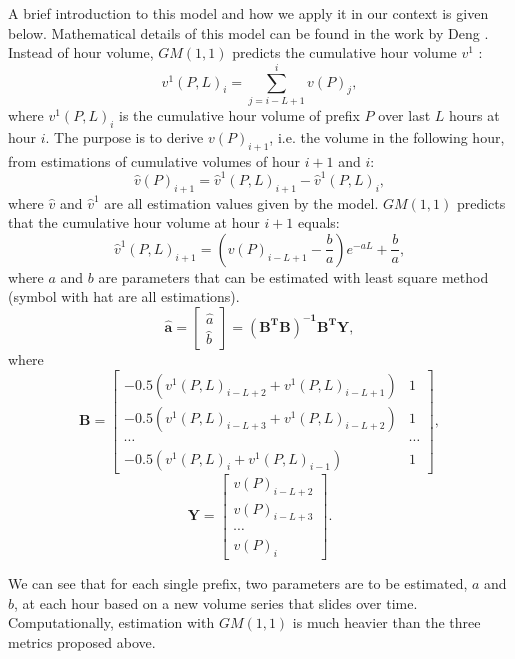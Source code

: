 A brief introduction to this model and how we apply it in our context is given below. Mathematical details of this model can be found in the work by Deng \cite{Julong1989}.
Instead of hour volume, $GM(1,1)$ predicts the cumulative hour volume $v^1$ :
\begin{equation*}
v^1(P,L)_{i} = \displaystyle \sum_{j=i-L+1}^{i} v(P)_j,
\end{equation*}
where $v^1(P,L)_{i}$ is the cumulative hour volume of prefix $P$ over last $L$ hours at hour $i$. The purpose is to derive $v(P)_{i+1}$, i.e. the volume in the following hour, from estimations of cumulative volumes of hour $i+1$ and $i$:
\begin{equation*}
\hat{v}(P)_{i+1} = \hat{v}^1(P,L)_{i+1} - \hat{v}^1(P,L)_{i},
\end{equation*}
where $\hat v$ and $\hat v ^1$ are all estimation values given by the model.
$GM(1,1)$ predicts that the cumulative hour volume at hour $i+1$ equals:
\begin{equation*}
\hat v ^1 (P,L)_{i+1} = (v(P)_{i-L+1} - \frac{b}{a}) e^{-aL} + \frac{b}{a},
\end{equation*}
where $a$ and $b$ are parameters that can be estimated with least square method (symbol with hat are all estimations).
\begin{equation*}
\mathbf{\hat a} = \begin{bmatrix}
\hat a \\ \hat b
\end{bmatrix} = \mathbf{(B^TB)^{-1}B^T Y},
\end{equation*}
where
\begin{equation*}
\mathbf{B} = \begin{bmatrix}
-0.5(v^1(P,L)_{i-L+2} + v^1(P,L)_{i-L+1}) & 1\\
-0.5(v^1(P,L)_{i-L+3} + v^1(P,L)_{i-L+2}) & 1\\
\cdots & \cdots \\
-0.5(v^1(P,L)_i + v^1(P,L)_{i-1}) & 1
\end{bmatrix},
\end{equation*}
\begin{equation*}
\mathbf{Y} = \begin{bmatrix}
v(P)_{i-L+2}\\
v(P)_{i-L+3}\\
\cdots\\
v(P)_i
\end{bmatrix}.
\end{equation*}

We can see that for each single prefix, two parameters are to be estimated, $a$ and $b$, at each hour based on a new volume series that slides over time. Computationally, estimation with $GM(1,1)$ is much heavier than the three metrics proposed above.

